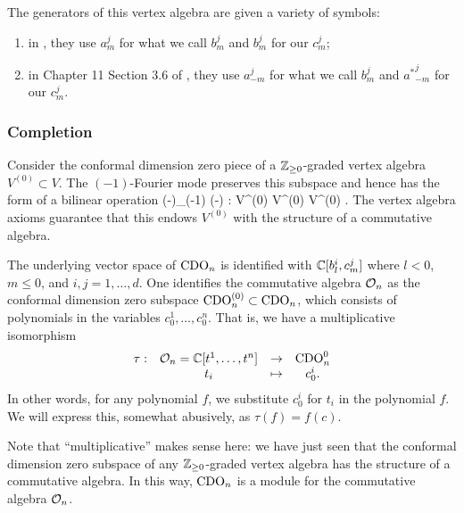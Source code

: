 \begin{rmk}
The generators of this vertex algebra are given a variety of symbols:
\begin{enumerate}
\item in \cite{MSV}, they use $a^j_{m}$ for what we call $b^j_m$ and $b^j_{m}$ for our $c^j_m$;
\item in Chapter 11 Section 3.6 of \cite{BZF}, they use $a^j_{-m}$ for what we call $b^j_m$ and ${a^{\ast}}^j_{-m}$ for our $c^j_m$.
\end{enumerate}
\end{rmk}

\subsubsection{Completion}

Consider the conformal dimension zero piece of a $\mathbb Z_{\geq 0}$-graded
vertex algebra $V^{(0)} \subset V$. The $(-1)$-Fourier mode preserves
this subspace and hence has the
form of a bilinear operation
\ben
(-)_{(-1)} (-) : V^{(0)} \times V^{(0)} \to V^{(0)} .
\een
The vertex algebra axioms guarantee that this endows $V^{(0)}$ with the structure
of a commutative algebra. 

The underlying vector space of ${\rm CDO}_n$ is identified with $\mathbb C [b_{l}^i, c_{m}^j]$ where $l < 0$, $m \leq 0$, and $i,j = 1,\ldots,d$. One identifies the commutative algebra $\mathcal O_n$ as the conformal dimension zero subspace ${\rm CDO}_n^{(0)} \subset {\rm CDO}_n$, 
which consists of polynomials in the variables $c_0^1,\ldots, c_0^{n}$. 
That is, we have a multiplicative isomorphism
\[
\begin{array}{cccc}
\label{poly}
\tau : &\mathcal O_n = \mathbb C [t^1,\ldots, t^n] &\to& {\rm CDO}^0_n\\ 
& t_i & \mapsto & c_0^i .
\end{array}
\]
In other words, for any polynomial $f$, we substitute $c^i_0$ for $t_i$ in the polynomial $f$.
We will express this, somewhat abusively, as $\tau(f) = f(c)$.

Note that ``multiplicative'' makes sense here: 
we have just seen that the conformal dimension zero subspace of any $\mathbb Z_{\geq 0}$-graded vertex algebra 
has the structure of a commutative algebra. 
In this way, ${\rm CDO}_n$ is a module for the commutative algebra $\mathcal O_n$.
 
